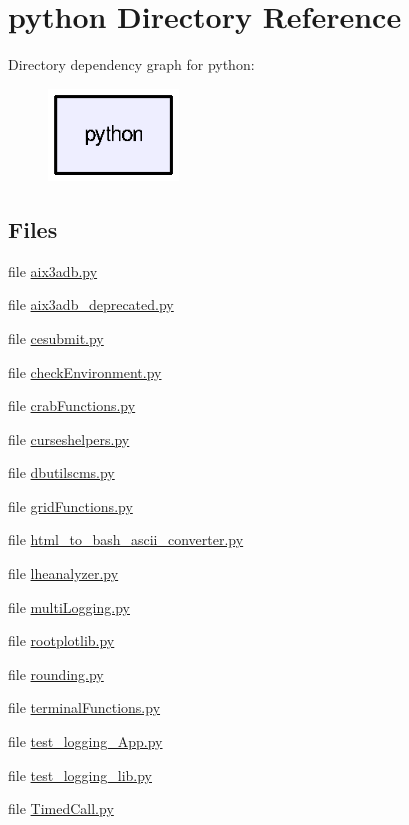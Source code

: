 \section{python Directory Reference}
\label{dir_7837fde3ab9c1fb2fc5be7b717af8d79}
Directory dependency graph for python\-:
\nopagebreak
\begin{figure}[H]
\begin{center}
\leavevmode
\includegraphics[width=98pt]{dir_7837fde3ab9c1fb2fc5be7b717af8d79_dep}
\end{center}
\end{figure}
\subsection*{Files}
\begin{DoxyCompactItemize}
\item 
file \hyperlink{aix3adb_8py}{aix3adb.\-py}
\item 
file \hyperlink{aix3adb__deprecated_8py}{aix3adb\-\_\-deprecated.\-py}
\item 
file \hyperlink{cesubmit_8py}{cesubmit.\-py}
\item 
file \hyperlink{checkEnvironment_8py}{check\-Environment.\-py}
\item 
file \hyperlink{crabFunctions_8py}{crab\-Functions.\-py}
\item 
file \hyperlink{curseshelpers_8py}{curseshelpers.\-py}
\item 
file \hyperlink{dbutilscms_8py}{dbutilscms.\-py}
\item 
file \hyperlink{gridFunctions_8py}{grid\-Functions.\-py}
\item 
file \hyperlink{html__to__bash__ascii__converter_8py}{html\-\_\-to\-\_\-bash\-\_\-ascii\-\_\-converter.\-py}
\item 
file \hyperlink{lheanalyzer_8py}{lheanalyzer.\-py}
\item 
file \hyperlink{multiLogging_8py}{multi\-Logging.\-py}
\item 
file \hyperlink{rootplotlib_8py}{rootplotlib.\-py}
\item 
file \hyperlink{rounding_8py}{rounding.\-py}
\item 
file \hyperlink{terminalFunctions_8py}{terminal\-Functions.\-py}
\item 
file \hyperlink{test__logging__App_8py}{test\-\_\-logging\-\_\-\-App.\-py}
\item 
file \hyperlink{test__logging__lib_8py}{test\-\_\-logging\-\_\-lib.\-py}
\item 
file \hyperlink{TimedCall_8py}{Timed\-Call.\-py}
\end{DoxyCompactItemize}

